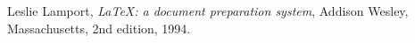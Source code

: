 

\begin{thebibliography}{0}

    Leslie Lamport,
    \textit{\LaTeX: a document preparation system},
    Addison Wesley, Massachusetts,
    2nd edition,
    1994.

\end{thebibliography}